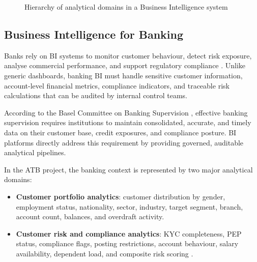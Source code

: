 \begin{figure}[H]
\centering
{}
\caption{Hierarchy of analytical domains in a Business Intelligence system\cite{chaudhuri2011}}
\label{fig:bi_domain_hierarchy}
\end{figure}
\FloatBarrier
\FloatBarrier

\subsection{Business Intelligence for Banking}

Banks rely on BI systems to monitor customer behaviour, detect risk exposure, analyse
commercial performance, and support regulatory compliance \cite{bcbs2011}. Unlike generic
dashboards, banking BI must handle sensitive customer information, account-level financial
metrics, compliance indicators, and traceable risk calculations that can be audited by
internal control teams.

According to the Basel Committee on Banking Supervision \cite{bcbs2011}, effective banking
supervision requires institutions to maintain consolidated, accurate, and timely data on
their customer base, credit exposures, and compliance posture. BI platforms directly address
this requirement by providing governed, auditable analytical pipelines.

In the ATB project, the banking context is represented by two major analytical domains:

\begin{itemize}
    \item \textbf{Customer portfolio analytics}: customer distribution by gender, employment
    status, nationality, sector, industry, target segment, branch, account count, balances,
    and overdraft activity.
    \item \textbf{Customer risk and compliance analytics}: KYC completeness, PEP status,
    compliance flags, posting restrictions, account behaviour, salary availability, dependent
    load, and composite risk scoring \cite{fatf2012}.
\end{itemize}

